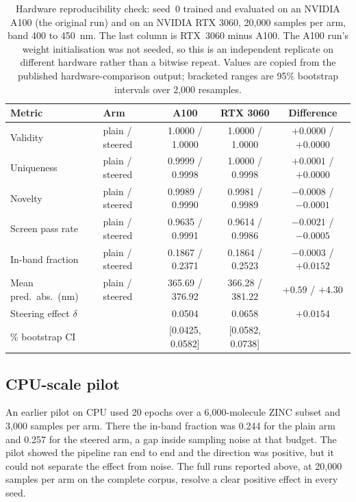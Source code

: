 \documentclass[11pt]{article}
\begin{document}
\begin{table}[htbp]
\centering
\caption{Hardware reproducibility check: seed~0 trained and evaluated on an NVIDIA A100
(the original run) and on an NVIDIA RTX 3060, 20{,}000 samples per arm, band 400 to
450~nm. The last column is RTX~3060 minus A100. The A100 run's weight initialisation was not
seeded, so this is an independent replicate on different hardware rather than a bitwise
repeat. Values are copied from the published hardware-comparison output; bracketed ranges are 95\%
bootstrap intervals over 2{,}000 resamples.}
\label{tab:hw}
\small
\setlength{\tabcolsep}{4pt}
\begin{tabular}{llccc}
\toprule
Metric & Arm & A100 & RTX 3060 & Difference \\
\midrule
Validity & plain / steered & 1.0000 / 1.0000 & 1.0000 / 1.0000 & $+0.0000$ / $+0.0000$ \\
Uniqueness & plain / steered & 0.9999 / 0.9998 & 1.0000 / 0.9998 & $+0.0001$ / $+0.0000$ \\
Novelty & plain / steered & 0.9989 / 0.9990 & 0.9981 / 0.9989 & $-0.0008$ / $-0.0001$ \\
Screen pass rate & plain / steered & 0.9635 / 0.9991 & 0.9614 / 0.9986 & $-0.0021$ / $-0.0005$ \\
In-band fraction & plain / steered & 0.1867 / 0.2371 & 0.1864 / 0.2523 & $-0.0003$ / $+0.0152$ \\
Mean pred.\ abs.\ (nm) & plain / steered & 365.69 / 376.92 & 366.28 / 381.22 & $+0.59$ / $+4.30$ \\
\midrule
Steering effect $\delta$ & & 0.0504 & 0.0658 & $+0.0154$ \\
\quad 95\% bootstrap CI & & [0.0425, 0.0582] & [0.0582, 0.0738] & \\
\bottomrule
\end{tabular}
\end{table}

\subsection{CPU-scale pilot}

An earlier pilot on CPU used 20 epochs over a 6{,}000-molecule ZINC subset and 3{,}000
samples per arm. There the in-band fraction was 0.244 for the plain arm and 0.257 for the
steered arm, a gap inside sampling noise at that budget. The pilot showed the pipeline ran
end to end and the direction was positive, but it could not separate the effect from
noise. The full runs reported above, at 20{,}000 samples per arm on the complete corpus,
resolve a clear positive effect in every seed.
\end{document}
